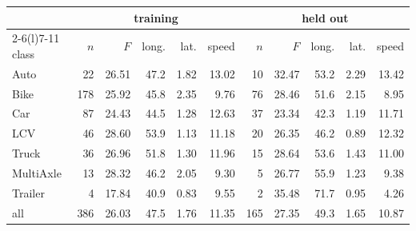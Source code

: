 \begin{tabular}{@{}l rrrrr rrrrr@{}}\toprule
 & \multicolumn{5}{c}{training} & \multicolumn{5}{c}{held out}\\
\cmidrule(lr){2-6}\cmidrule(l){7-11}
class & $n$ & $F$ & long. & lat. & speed & $n$ & $F$ & long. & lat. & speed\\\midrule
Auto & 22 & 26.51 & 47.2 & 1.82 & 13.02 & 10 & 32.47 & 53.2 & 2.29 & 13.42\\
Bike & 178 & 25.92 & 45.8 & 2.35 & 9.76 & 76 & 28.46 & 51.6 & 2.15 & 8.95\\
Car & 87 & 24.43 & 44.5 & 1.28 & 12.63 & 37 & 23.34 & 42.3 & 1.19 & 11.71\\
LCV & 46 & 28.60 & 53.9 & 1.13 & 11.18 & 20 & 26.35 & 46.2 & 0.89 & 12.32\\
Truck & 36 & 26.96 & 51.8 & 1.30 & 11.96 & 15 & 28.64 & 53.6 & 1.43 & 11.00\\
MultiAxle & 13 & 28.32 & 46.2 & 2.05 & 9.30 & 5 & 26.77 & 55.9 & 1.23 & 9.38\\
Trailer & 4 & 17.84 & 40.9 & 0.83 & 9.55 & 2 & 35.48 & 71.7 & 0.95 & 4.26\\
\midrule all & 386 & 26.03 & 47.5 & 1.76 & 11.35 & 165 & 27.35 & 49.3 & 1.65 & 10.87\\
\bottomrule\end{tabular}
